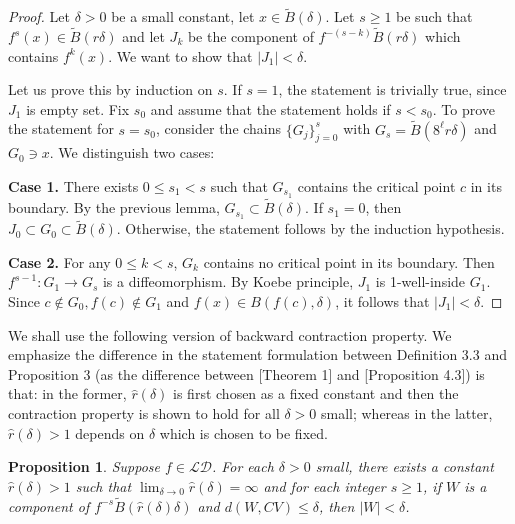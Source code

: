 \documentclass[11pt,oneside]{article}
\theoremstyle{plain}
\newtheorem{prop}{Proposition}
\numberwithin{equation}{section}
\numberwithin{figure}{section}
\numberwithin{table}{section}
\begin{document}
\begin{proof}

Let $\delta >0$ be a small constant, let $x \in \tilde B(\delta)$. Let $s \geq 1$ be such that $f^s(x) \in \tilde B(r \delta)$ and let $J_k$ be the component of $f^{-(s-k)} \tilde B(r \delta)$ which contains $f^k(x)$. We want to show that $|J_1| < \delta$. 

Let us prove this by induction on $s$. If $s =1$, the statement is trivially true, since $J_1$ is empty set. Fix $s_0$ and assume that the statement holds if $s < s_0$. To prove the statement for $s = s_0$, consider the chains $\{ G_j \}_{j=0}^s$ with $G_s = \tilde B(8^{\ell}r \delta)$ and $G_0 \ni x$. We distinguish two cases:

{\bf Case 1.} There exists $0 \leq s_1 < s$ such that $G_{s_1}$ contains the critical point $c$ in its boundary. By the previous lemma, $G_{s_1} \subset \tilde B(\delta)$. If $s_1 = 0$, then $J_0 \subset G_0 \subset \tilde B(\delta)$. Otherwise, the statement follows by the induction hypothesis.


{\bf Case 2.} For any $0 \leq k < s$, $G_k$ contains no critical point in its boundary. Then $f^{s-1} : G_1 \to G_s$ is a diffeomorphism. By Koebe principle, $J_1$ is 1-well-inside $G_1$. Since $c \notin G_0, f(c) \notin G_1$ and $f(x) \in B(f(c), \delta)$, it follows that $|J_1| < \delta$. 

\end{proof}


We shall use the following version of backward contraction property. We emphasize the difference in the statement formulation between Definition 3.3 and Proposition 3 (as the difference between \cite{BRSS}[Theorem 1] and \cite{S}[Proposition 4.3]) is that: in the former, $\hat r(\delta)$ is first chosen as a fixed constant and then the contraction property is shown to hold for all $\delta > 0$ small; whereas in the latter, $\hat r(\delta) > 1$ depends on $\delta$ which is chosen to be fixed.


\begin{prop}
Suppose $f \in \mathcal {LD}$. For each $\delta >0$ small, there exists a constant $\hat r (\delta) > 1$ such that $\lim_{\delta \to 0} \hat r(\delta) = \infty$ and for each integer $s \geq 1$, if $W$ is a component of $f^{-s}\tilde B(\hat r(\delta) \delta)$ and $d(W, CV) \leq \delta$, then $|W| < \delta$.
\end{prop}
\end{document}
